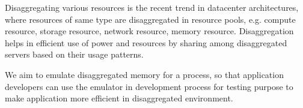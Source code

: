 \begin{Abstract}
Disaggregating various resources is the recent trend in datacenter architectures, where resources of same type are disaggregated in resource pools, e.g. compute resource, storage resource, network resource, memory resource. Disaggregation helps in efficient use of power and resources by sharing among disaggregated servers based on their usage patterns. 

We aim to emulate disaggregated memory for a process, so that application developers can use the emulator in development process for testing purpose to make application more efficient in disaggregated environment.
%
%
%
%
%
\end{Abstract}

